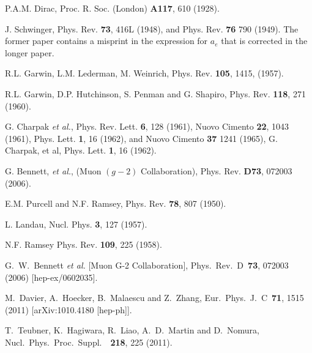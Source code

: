 \begin{thebibliography}{99}





 P.A.M. Dirac, Proc. R. Soc. (London) {\bf A117}, 610 (1928).


  J. Schwinger, Phys. Rev. {\bf 73}, 416L (1948), and
Phys. Rev. {\bf 76} 790 (1949). The former paper contains a misprint
in the expression for $a_e$ that is corrected in the longer paper.

 R.L. Garwin, L.M. Lederman, M. Weinrich,
Phys. Rev. {\bf 105}, 1415, (1957).

 R.L. Garwin, D.P. Hutchinson, S. Penman and G. Shapiro,
Phys. Rev. {\bf 118}, 271 (1960).

 G. Charpak {\it et al.},
 Phys. Rev. Lett. {\bf 6}, 128 (1961),
 Nuovo Cimento {\bf  22}, 1043 (1961),
 Phys. Lett. {\bf 1}, 16 (1962), and Nuovo Cimento {\bf 37} 1241 (1965),
 G. Charpak, et al,  Phys. Lett. {\bf 1}, 16 (1962).

 G. Bennett, {\it et al.},  (Muon $(g-2)$ Collaboration),
Phys. Rev. {\bf D73}, 072003 (2006).

E.M. Purcell and N.F. Ramsey,
 Phys. Rev. {\bf 78}, 807 (1950).

  L. Landau, Nucl. Phys. {\bf 3}, 127 (1957).

 N.F. Ramsey Phys. Rev. {\bf 109}, 225 (1958).


  G.~W.~Bennett {\it et al.} [Muon G-2 Collaboration],
  Phys.\ Rev.\ D\ {\bf 73}, 072003  (2006)
  [hep-ex/0602035].

  M.~Davier, A.~Hoecker, B.~Malaescu and Z.~Zhang,
  Eur.\ Phys.\ J.\ C\ {\bf 71}, 1515  (2011)
  [arXiv:1010.4180 [hep-ph]].

  T.~Teubner, K.~Hagiwara, R.~Liao, A.~D.~Martin and D.~Nomura,
  Nucl.\ Phys.\ Proc.\ Suppl.\ \ {\bf 218}, 225  (2011).


\end{thebibliography}
